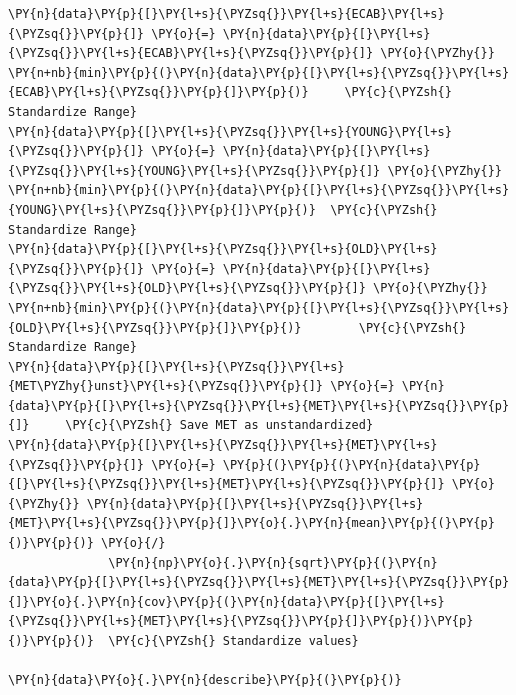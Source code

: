 \documentclass[10pt]{article}\usepackage[]{graphicx}\usepackage[]{xcolor}
\begin{document}
\begin{Verbatim}[commandchars=\\\{\}]
\PY{n}{data}\PY{p}{[}\PY{l+s}{\PYZsq{}}\PY{l+s}{ECAB}\PY{l+s}{\PYZsq{}}\PY{p}{]} \PY{o}{=} \PY{n}{data}\PY{p}{[}\PY{l+s}{\PYZsq{}}\PY{l+s}{ECAB}\PY{l+s}{\PYZsq{}}\PY{p}{]} \PY{o}{\PYZhy{}} \PY{n+nb}{min}\PY{p}{(}\PY{n}{data}\PY{p}{[}\PY{l+s}{\PYZsq{}}\PY{l+s}{ECAB}\PY{l+s}{\PYZsq{}}\PY{p}{]}\PY{p}{)}     \PY{c}{\PYZsh{} Standardize Range}
\PY{n}{data}\PY{p}{[}\PY{l+s}{\PYZsq{}}\PY{l+s}{YOUNG}\PY{l+s}{\PYZsq{}}\PY{p}{]} \PY{o}{=} \PY{n}{data}\PY{p}{[}\PY{l+s}{\PYZsq{}}\PY{l+s}{YOUNG}\PY{l+s}{\PYZsq{}}\PY{p}{]} \PY{o}{\PYZhy{}} \PY{n+nb}{min}\PY{p}{(}\PY{n}{data}\PY{p}{[}\PY{l+s}{\PYZsq{}}\PY{l+s}{YOUNG}\PY{l+s}{\PYZsq{}}\PY{p}{]}\PY{p}{)}  \PY{c}{\PYZsh{} Standardize Range}
\PY{n}{data}\PY{p}{[}\PY{l+s}{\PYZsq{}}\PY{l+s}{OLD}\PY{l+s}{\PYZsq{}}\PY{p}{]} \PY{o}{=} \PY{n}{data}\PY{p}{[}\PY{l+s}{\PYZsq{}}\PY{l+s}{OLD}\PY{l+s}{\PYZsq{}}\PY{p}{]} \PY{o}{\PYZhy{}} \PY{n+nb}{min}\PY{p}{(}\PY{n}{data}\PY{p}{[}\PY{l+s}{\PYZsq{}}\PY{l+s}{OLD}\PY{l+s}{\PYZsq{}}\PY{p}{]}\PY{p}{)}        \PY{c}{\PYZsh{} Standardize Range}
\PY{n}{data}\PY{p}{[}\PY{l+s}{\PYZsq{}}\PY{l+s}{MET\PYZhy{}unst}\PY{l+s}{\PYZsq{}}\PY{p}{]} \PY{o}{=} \PY{n}{data}\PY{p}{[}\PY{l+s}{\PYZsq{}}\PY{l+s}{MET}\PY{l+s}{\PYZsq{}}\PY{p}{]}     \PY{c}{\PYZsh{} Save MET as unstandardized}
\PY{n}{data}\PY{p}{[}\PY{l+s}{\PYZsq{}}\PY{l+s}{MET}\PY{l+s}{\PYZsq{}}\PY{p}{]} \PY{o}{=} \PY{p}{(}\PY{p}{(}\PY{n}{data}\PY{p}{[}\PY{l+s}{\PYZsq{}}\PY{l+s}{MET}\PY{l+s}{\PYZsq{}}\PY{p}{]} \PY{o}{\PYZhy{}} \PY{n}{data}\PY{p}{[}\PY{l+s}{\PYZsq{}}\PY{l+s}{MET}\PY{l+s}{\PYZsq{}}\PY{p}{]}\PY{o}{.}\PY{n}{mean}\PY{p}{(}\PY{p}{)}\PY{p}{)} \PY{o}{/}
              \PY{n}{np}\PY{o}{.}\PY{n}{sqrt}\PY{p}{(}\PY{n}{data}\PY{p}{[}\PY{l+s}{\PYZsq{}}\PY{l+s}{MET}\PY{l+s}{\PYZsq{}}\PY{p}{]}\PY{o}{.}\PY{n}{cov}\PY{p}{(}\PY{n}{data}\PY{p}{[}\PY{l+s}{\PYZsq{}}\PY{l+s}{MET}\PY{l+s}{\PYZsq{}}\PY{p}{]}\PY{p}{)}\PY{p}{)}\PY{p}{)}  \PY{c}{\PYZsh{} Standardize values}

\PY{n}{data}\PY{o}{.}\PY{n}{describe}\PY{p}{(}\PY{p}{)}
\end{Verbatim}
\end{document}
